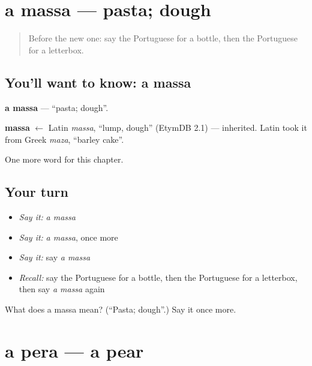 \section[a massa]{a massa — pasta; dough}

\label{lesson:PT-C99-massa}



\begin{quote}
Before the new one: say the Portuguese for a bottle, then the Portuguese for a letterbox.
\end{quote}

\subsection*{You'll want to know: a massa}
\textbf{a massa} — \textquotedblleft{}pasta; dough\textquotedblright{}.

\begin{cousinweb}
\textbf{massa} $\leftarrow$ Latin \emph{massa}, \textquotedblleft{}lump, dough\textquotedblright{} (EtymDB 2.1) — inherited. Latin took it from Greek \emph{maza}, \textquotedblleft{}barley cake\textquotedblright{}.
\end{cousinweb}

\begin{grammarlens}[title={What you've built}]
One more word for this chapter.
\end{grammarlens}

\subsection*{Your turn}
\begin{itemize}
\raggedright
  \item \emph{Say it:} \emph{a massa}
  \item \emph{Say it:} \emph{a massa}, once more
  \item \emph{Say it:} say \emph{a massa}
  \item \emph{Recall:} say the Portuguese for a bottle, then the Portuguese for a letterbox, then say \emph{a massa} again
\end{itemize}

\begin{tcolorbox}[breakable,colback=teal!4,colframe=teal!35!black,title={Before you move on}]
What does a massa mean? (\textquotedblleft{}Pasta; dough\textquotedblright{}.) Say it once more.
\end{tcolorbox}
\section[a pera]{a pera — a pear}

